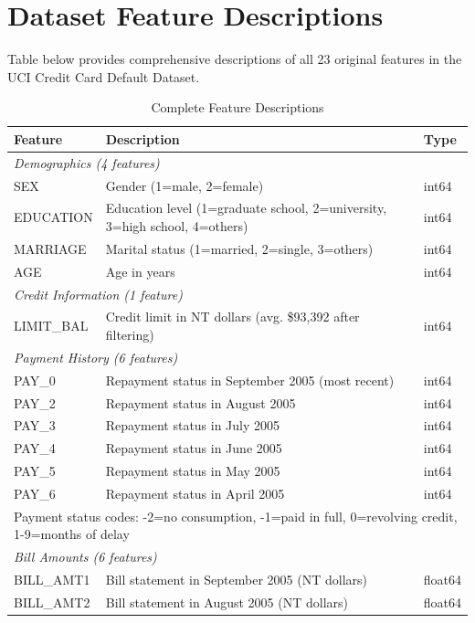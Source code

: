 \documentclass[12pt]{article}
\begin{document}
\section{Dataset Feature Descriptions}\label{app:feature_table}

Table below provides comprehensive descriptions of all 23 original features in the UCI Credit Card Default Dataset.

\begin{table}[H]
\centering
\caption{Complete Feature Descriptions}
\label{tab:features}
\small
\begin{tabular}{lp{8cm}l}
\toprule
\textbf{Feature} & \textbf{Description} & \textbf{Type} \\
\midrule
\multicolumn{3}{l}{\textit{Demographics (4 features)}} \\
SEX & Gender (1=male, 2=female) & int64 \\
EDUCATION & Education level (1=graduate school, 2=university, 3=high school, 4=others) & int64 \\
MARRIAGE & Marital status (1=married, 2=single, 3=others) & int64 \\
AGE & Age in years & int64 \\
\midrule
\multicolumn{3}{l}{\textit{Credit Information (1 feature)}} \\
LIMIT\_BAL & Credit limit in NT dollars (avg. \$93,392 after filtering) & int64 \\
\midrule
\multicolumn{3}{l}{\textit{Payment History (6 features)}} \\
PAY\_0 & Repayment status in September 2005 (most recent) & int64 \\
PAY\_2 & Repayment status in August 2005 & int64 \\
PAY\_3 & Repayment status in July 2005 & int64 \\
PAY\_4 & Repayment status in June 2005 & int64 \\
PAY\_5 & Repayment status in May 2005 & int64 \\
PAY\_6 & Repayment status in April 2005 & int64 \\
\multicolumn{3}{l}{\footnotesize Payment status codes: -2=no consumption, -1=paid in full, 0=revolving credit, 1-9=months of delay} \\
\midrule
\multicolumn{3}{l}{\textit{Bill Amounts (6 features)}} \\
BILL\_AMT1 & Bill statement in September 2005 (NT dollars) & float64 \\
BILL\_AMT2 & Bill statement in August 2005 (NT dollars) & float64 \\

\end{tabular}
\end{table}
\end{document}
